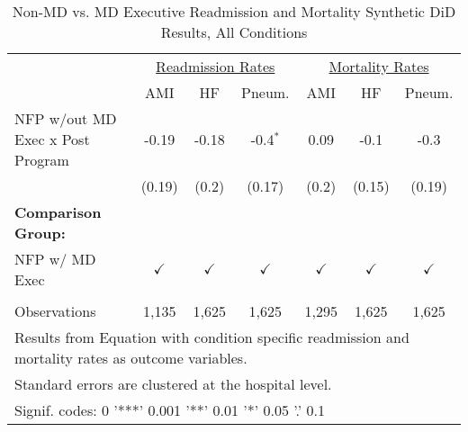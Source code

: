 \begin{table}[ht!]

\caption{\label{tab:MD_noMD_readmort_condition_synth}Non-MD vs. MD Executive Readmission and Mortality Synthetic DiD Results, All Conditions}
\centering
\begin{tabular}[t]{lcccccc}
\toprule
\multicolumn{1}{c}{} & \multicolumn{3}{c}{\underline{Readmission Rates}} & \multicolumn{3}{c}{\underline{Mortality Rates}} \\
 & AMI & HF & Pneum. & AMI & HF & Pneum.\\
\midrule
NFP w/out MD Exec x Post Program & -0.19 & -0.18 & -0.4$^{*}$ & 0.09 & -0.1 & -0.3\\
 & (0.19) & (0.2) & (0.17) & (0.2) & (0.15) & (0.19)\\
\textbf{Comparison Group:} &  &  &  &  &  & \\
NFP w/ MD Exec & $\checkmark$ & $\checkmark$ & $\checkmark$ & $\checkmark$ & $\checkmark$ & $\checkmark$\\
 &  &  &  &  &  & \\
\addlinespace
Observations & 1,135 & 1,625 & 1,625 & 1,295 & 1,625 & 1,625\\
\bottomrule
\multicolumn{7}{l}{\textsuperscript{} Results from Equation with condition specific readmission and mortality rates as outcome variables.}\\
\multicolumn{7}{l}{\textsuperscript{} Standard errors are clustered at the hospital level.}\\
\multicolumn{7}{l}{\textsuperscript{} Signif. codes: 0 '***' 0.001 '**' 0.01 '*' 0.05 '.' 0.1}\\
\end{tabular}
\end{table}
